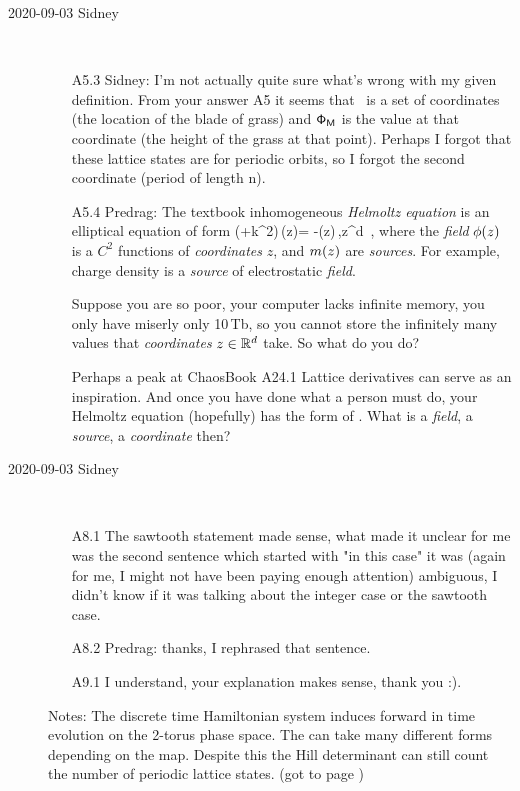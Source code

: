 \begin{description}
\item[2020-09-03 Sidney]~~
\begin{itemize}
	\item[A5.3] Sidney:
I'm not actually quite sure what's wrong with my given definition. From
your answer A5 it seems that \Mm\ is a set of
coordinates (the location of the blade of grass) and $\mathsf{\Phi}_{\mathsf{M}}$ is
the value at that coordinate (the height of the grass at that point).
Perhaps I forgot that these lattice states are for periodic orbits, so I
forgot the second coordinate (period of length n).
	\item[A5.4] Predrag: %
The textbook inhomogeneous \emph{Helmoltz equation} is an elliptical
equation of form
\beq
   (\Box+k^2)\,\ssp(z)= -\m(z)\,,\qquad z\in \reals^d
\,,
\label{CatMapContinuesPC}
\eeq
where the \emph{field} $\phi(z)$ is a $C^2$ functions of
\emph{coordinates} $z$, and $m(z)$ are \emph{sources}. For example,
charge density is a \emph{source} of electrostatic \emph{field}.

Suppose you are so poor, your computer lacks infinite memory, you only
have miserly only 10\,Tb, so you cannot store the infinitely many values
that \emph{coordinates} $z\in \mathbb{R}^d$ take. So what do you do?

Perhaps a peak at ChaosBook
 {A24.1
Lattice derivatives} can serve as an inspiration. And once you have done
what a person must do, your Helmoltz equation (hopefully) has the form of
.
What is a \emph{field}, a \emph{source}, a \emph{coordinate} then?
\end{itemize}


\item[2020-09-03 Sidney]~~
\begin{itemize}
	\item[A8.1]
The sawtooth statement made sense, what made it unclear for me was the second sentence which started with "in this case" it was (again for me, I might not have been paying enough attention) ambiguous, I didn't know if it was talking about the integer case or the sawtooth case.  	
	\item[A8.2] Predrag: thanks, I rephrased that sentence.
	\item[A9.1]
I understand, your explanation makes sense, thank you :).
\end{itemize}

\vspace{3mm}

Notes: The discrete time Hamiltonian system induces forward in time evolution on the 2-torus phase space. The {\jacobianOrb} can take many different forms depending on the map. Despite this the Hill determinant can still count the number of periodic lattice states.
(got to page )


\end{description}
